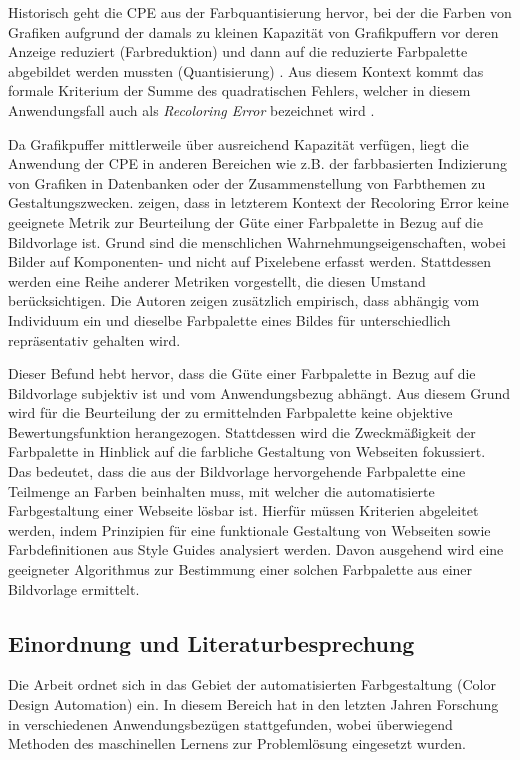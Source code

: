 \documentclass[11pt,a4paper,bibliography=totoc,twocolumn]{scrartcl}
\begin{document}
Historisch geht die CPE aus der Farbquantisierung hervor, bei der die Farben von Grafiken aufgrund der damals zu kleinen Kapazität von Grafikpuffern vor deren Anzeige reduziert (Farbreduktion) und dann auf die reduzierte Farbpalette abgebildet werden mussten (Quantisierung) \citep{variance}. Aus diesem Kontext kommt das formale Kriterium der Summe des quadratischen Fehlers, welcher in diesem Anwendungsfall auch als \emph{Recoloring Error} bezeichnet wird \citep{colorthemes}.

Da Grafikpuffer mittlerweile über ausreichend Kapazität verfügen, liegt die Anwendung der CPE in anderen Bereichen wie z.B. der farbbasierten Indizierung von Grafiken in Datenbanken oder der Zusammenstellung von Farbthemen zu Gestaltungszwecken. \citet{colorthemes} zeigen, dass in letzterem Kontext der Recoloring Error keine geeignete Metrik zur Beurteilung der Güte einer Farbpalette in Bezug auf die Bildvorlage ist. Grund sind die menschlichen Wahrnehmungseigenschaften, wobei Bilder auf Komponenten- und nicht auf Pixelebene erfasst werden. Stattdessen werden eine Reihe anderer Metriken vorgestellt, die diesen Umstand berücksichtigen. Die Autoren zeigen zusätzlich empirisch, dass abhängig vom Individuum ein und dieselbe Farbpalette eines Bildes für unterschiedlich repräsentativ gehalten wird. 

Dieser Befund hebt hervor, dass die Güte einer Farbpalette in Bezug auf die Bildvorlage subjektiv ist und vom Anwendungsbezug abhängt. Aus diesem Grund wird für die Beurteilung der zu ermittelnden Farbpalette keine objektive Bewertungsfunktion herangezogen. Stattdessen wird die Zweckmäßigkeit der Farbpalette in Hinblick auf die farbliche Gestaltung von Webseiten fokussiert. Das bedeutet, dass die aus der Bildvorlage hervorgehende Farbpalette eine Teilmenge an Farben beinhalten muss, mit welcher die automatisierte Farbgestaltung einer Webseite lösbar ist. Hierfür müssen Kriterien abgeleitet werden, indem Prinzipien für eine funktionale Gestaltung von Webseiten sowie Farbdefinitionen aus Style Guides analysiert werden. Davon ausgehend wird eine geeigneter Algorithmus zur Bestimmung einer solchen Farbpalette aus einer Bildvorlage ermittelt.

\subsection{Einordnung und Literaturbesprechung}

Die Arbeit ordnet sich in das Gebiet der automatisierten Farbgestaltung (Color Design Automation) ein. In diesem Bereich hat in den letzten Jahren Forschung in verschiedenen Anwendungsbezügen stattgefunden, wobei überwiegend Methoden des maschinellen Lernens zur Problemlösung eingesetzt wurden.
\end{document}
